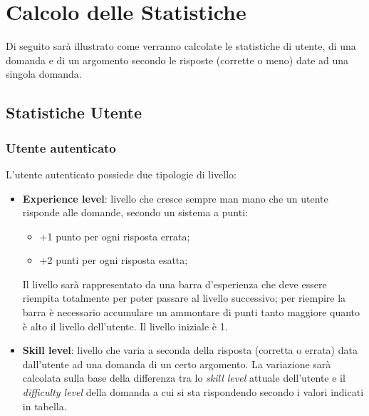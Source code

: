 \section{Calcolo delle Statistiche}
Di seguito sarà illustrato come verranno calcolate le statistiche di utente, di una domanda e di un argomento secondo le risposte (corrette o meno) date ad una singola domanda.

\subsection{Statistiche Utente}
\subsubsection{Utente autenticato}
L'utente autenticato possiede due tipologie di livello:
\begin{itemize}
	\item \textbf{Experience level}: livello che cresce sempre man mano che un utente risponde alle domande, secondo un sistema a punti: 
	\begin{itemize}
		\item +1 punto per ogni risposta errata;
		\item +2 punti per ogni risposta esatta;
	\end{itemize}
	Il livello sarà rappresentato da una barra d'esperienza che deve essere riempita totalmente per poter passare al livello successivo; per riempire la barra è necessario accumulare un ammontare di punti tanto maggiore quanto è alto il livello dell'utente. Il livello iniziale è 1.
	\item \textbf{Skill level}: livello che varia a seconda della risposta (corretta o errata) data dall'utente ad una domanda di un certo argomento. La variazione sarà calcolata sulla base della differenza tra lo \textit{skill level} attuale dell'utente e il \textit{difficulty level} della domanda a cui si sta rispondendo secondo i valori indicati in tabella.
	

\end{itemize}
